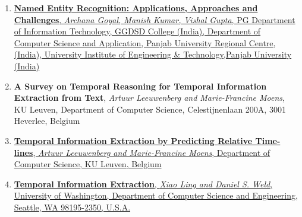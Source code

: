 \documentclass{report}
\begin{document}
\begin{enumerate}
\item \href{https://pdfs.semanticscholar.org/2060/5fdae23f6e8d945deb22e09c46cecebb4f35.pdf}{\textbf{Named Entity Recognition: Applications, Approaches and Challenges}, \textit{Archana Goyal, Manish Kumar, Vishal Gupta}, PG Department of Information Technology, GGDSD College (India), Department of Computer Science and Application, Panjab University Regional Centre, (India), University Institute of Engineering \& Technology,Panjab University (India)}
\item \textbf{A Survey on Temporal Reasoning for Temporal Information Extraction from Text}, \textit{Artuur Leeuwenberg and Marie-Francine Moens}, KU Leuven, Department of Computer Science, Celestijnenlaan 200A, 3001 Heverlee, Belgium
\item \href{https://aclweb.org/anthology/D18-1155}{\textbf{Temporal Information Extraction by Predicting Relative Time-lines}, \textit{Artuur Leeuwenberg and Marie-Francine Moens}, Department of Computer Science, KU Leuven, Belgium}
\item \href{https://homes.cs.washington.edu/~weld/papers/ling-aaai10.pdf}{\textbf{Temporal Information Extraction}, \textit{Xiao Ling and Daniel S. Weld}, University of Washington, Department of Computer Science and Engineering, Seattle, WA 98195-2350, U.S.A.}
\end{enumerate}
\end{document}
